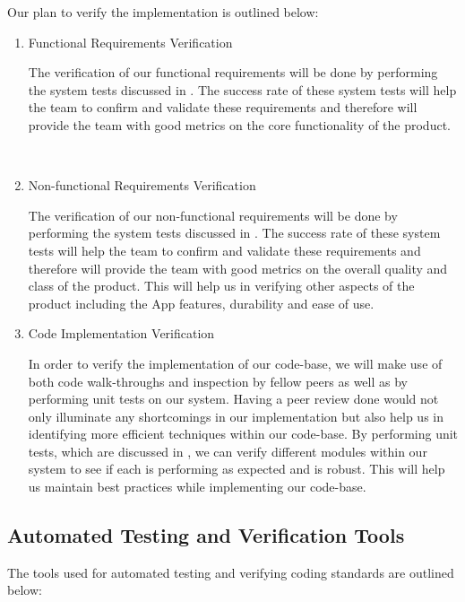 \documentclass[12pt, titlepage]{article}
\begin{document}
Our plan to verify the implementation is outlined below:
\begin{enumerate}
\item Functional Requirements Verification

\subitem The verification of our functional requirements will be done by performing the system tests discussed in . The success rate of these system tests will help the team to confirm and validate these requirements and therefore will provide the team with good metrics on the core functionality of the product.

~\newpage

\item Non-functional Requirements Verification

\subitem The verification of our non-functional requirements will be done by performing the system tests discussed in . The success rate of these system tests will help the team to confirm and validate these requirements and therefore will provide the team with good metrics on the overall quality and class of the product. This will help us in verifying other aspects of the product including the App features, durability and ease of use.

\item Code Implementation Verification

\subitem In order to verify the implementation of our code-base, we will make use of both code walk-throughs and inspection by fellow peers as well as by performing unit tests on our system. Having a peer review done would not only illuminate any shortcomings in our implementation but also help us in identifying more efficient techniques within our code-base. By performing unit tests, which are discussed in , we can verify different modules within our system to see if each is performing as expected and is robust. This will help us maintain best practices while implementing our code-base.

\end{enumerate}


\subsection{Automated Testing and Verification Tools}
The tools used for automated testing and verifying coding standards are outlined below:
\end{document}
